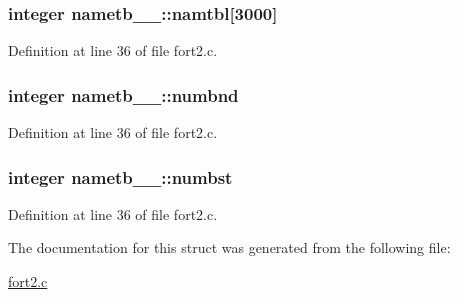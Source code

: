 \subsubsection[{\texorpdfstring{namtbl}{namtbl}}]{\setlength{\rightskip}{0pt plus 5cm}integer nametb\+\_\+\_\+\+::namtbl\mbox{[}3000\mbox{]}}\hypertarget{structnametb__1___afbd53b7fcd93c67699199f76298c40d0}{}\label{structnametb__1___afbd53b7fcd93c67699199f76298c40d0}


Definition at line 36 of file fort2.\+c.

\subsubsection[{\texorpdfstring{numbnd}{numbnd}}]{\setlength{\rightskip}{0pt plus 5cm}integer nametb\+\_\+\_\+\+::numbnd}\hypertarget{structnametb__1___acdc63682356af49e0a08c62708659362}{}\label{structnametb__1___acdc63682356af49e0a08c62708659362}


Definition at line 36 of file fort2.\+c.

\subsubsection[{\texorpdfstring{numbst}{numbst}}]{\setlength{\rightskip}{0pt plus 5cm}integer nametb\+\_\+\_\+\+::numbst}\hypertarget{structnametb__1___a3a45d2310c7fe0ec0d63a491b42bd7fe}{}\label{structnametb__1___a3a45d2310c7fe0ec0d63a491b42bd7fe}


Definition at line 36 of file fort2.\+c.



The documentation for this struct was generated from the following file\+:\begin{DoxyCompactItemize}
\item 
\hyperlink{fort2_8c}{fort2.\+c}\end{DoxyCompactItemize}
